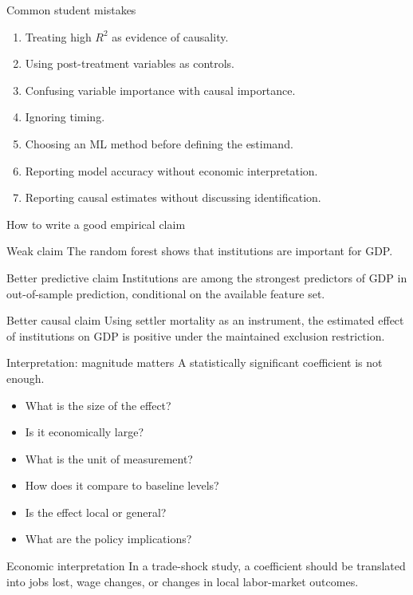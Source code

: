 \documentclass[aspectratio=169,11pt]{beamer}
\newcommand{\econ}[1]{\begin{exampleblock}{Economic interpretation}#1\end{exampleblock}}
\begin{document}
\begin{frame}{Common student mistakes}
\begin{enumerate}
  \item Treating high $R^2$ as evidence of causality.
  \item Using post-treatment variables as controls.
  \item Confusing variable importance with causal importance.
  \item Ignoring timing.
  \item Choosing an ML method before defining the estimand.
  \item Reporting model accuracy without economic interpretation.
  \item Reporting causal estimates without discussing identification.
\end{enumerate}
\end{frame}

\begin{frame}{How to write a good empirical claim}
\begin{block}{Weak claim}
The random forest shows that institutions are important for GDP.
\end{block}
\begin{alertblock}{Better predictive claim}
Institutions are among the strongest predictors of GDP in out-of-sample prediction, conditional on the available feature set.
\end{alertblock}
\begin{exampleblock}{Better causal claim}
Using settler mortality as an instrument, the estimated effect of institutions on GDP is positive under the maintained exclusion restriction.
\end{exampleblock}
\end{frame}

\begin{frame}{Interpretation: magnitude matters}
A statistically significant coefficient is not enough.
\begin{itemize}
  \item What is the size of the effect?
  \item Is it economically large?
  \item What is the unit of measurement?
  \item How does it compare to baseline levels?
  \item Is the effect local or general?
  \item What are the policy implications?
\end{itemize}
\econ{
In a trade-shock study, a coefficient should be translated into jobs lost, wage changes, or changes in local labor-market outcomes.
}
\end{frame}
\end{document}
